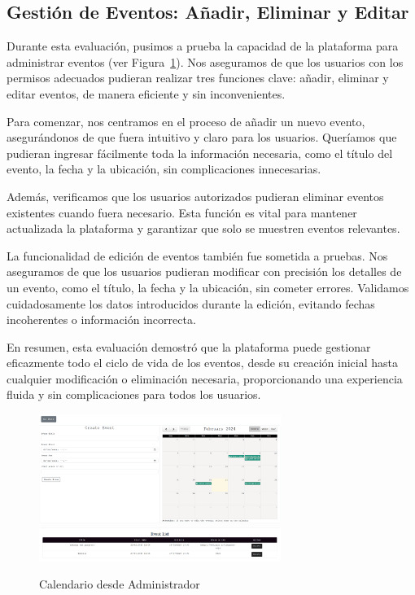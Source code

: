 \documentclass[a4paper, 12pt]{book}
\begin{document}
\subsection{Gestión de Eventos: Añadir, Eliminar y Editar}
\label{sec:add-delete-edit-events}

Durante esta evaluación, pusimos a prueba la capacidad de la plataforma para administrar eventos (ver Figura~\ref{fig:calendarioadmin}). Nos aseguramos de que los 
usuarios con los permisos adecuados pudieran realizar tres funciones clave: añadir, eliminar y editar eventos, de manera eficiente y sin inconvenientes. 

Para comenzar, nos centramos en el proceso de añadir un nuevo evento, asegurándonos de que fuera intuitivo y claro para los usuarios. Queríamos que pudieran 
ingresar fácilmente toda la información necesaria, como el título del evento, la fecha y la ubicación, sin complicaciones innecesarias.

Además, verificamos que los usuarios autorizados pudieran eliminar eventos existentes cuando fuera necesario. Esta función es vital para mantener actualizada 
la plataforma y garantizar que solo se muestren eventos relevantes.

La funcionalidad de edición de eventos también fue sometida a pruebas. Nos aseguramos de que los usuarios pudieran modificar con precisión los detalles de 
un evento, como el título, la fecha y la ubicación, sin cometer errores. Validamos cuidadosamente los datos introducidos durante la edición, evitando fechas 
incoherentes o información incorrecta.

En resumen, esta evaluación demostró que la plataforma puede gestionar eficazmente todo el ciclo de vida de los eventos, desde su creación inicial hasta 
cualquier modificación o eliminación necesaria, proporcionando una experiencia fluida y sin complicaciones para todos los usuarios.

\begin{figure}
  \centering
  \includegraphics[width=0.7\textwidth]{img/calendarioadmin.png}
  \includegraphics[width=0.7\textwidth]{img/calendarioadmin2.png}
  \caption{Calendario desde Administrador}
  \label{fig:calendarioadmin}
\end{figure}
\end{document}
